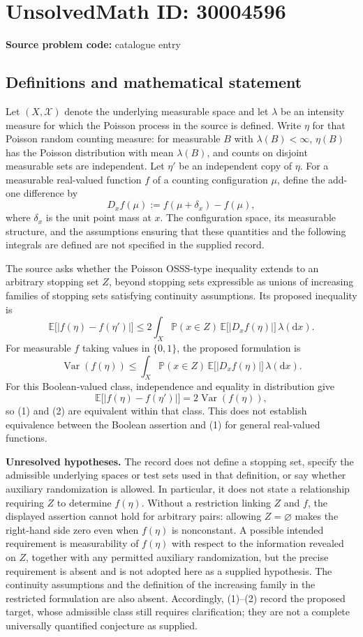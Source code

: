 \documentclass[11pt]{article}
\begin{document}
\section*{UnsolvedMath ID: 30004596}
\textbf{Source problem code:} catalogue entry
\subsection{Definitions and mathematical statement}
Let \((X,\mathcal X)\) denote the underlying measurable space and let \(\lambda\) be an intensity measure for which the Poisson process in the source is defined. Write \(\eta\) for that Poisson random counting measure: for measurable \(B\) with \(\lambda(B)<\infty\), \(\eta(B)\) has the Poisson distribution with mean \(\lambda(B)\), and counts on disjoint measurable sets are independent. Let \(\eta'\) be an independent copy of \(\eta\). For a measurable real-valued function \(f\) of a counting configuration \(\mu\), define the add-one difference by
\[
D_xf(\mu):=f(\mu+\delta_x)-f(\mu),
\]
where \(\delta_x\) is the unit point mass at \(x\). The configuration space, its measurable structure, and the assumptions ensuring that these quantities and the following integrals are defined are not specified in the supplied record.

The source asks whether the Poisson OSSS-type inequality extends to an arbitrary stopping set \(Z\), beyond stopping sets expressible as unions of increasing families of stopping sets satisfying continuity assumptions. Its proposed inequality is
\[
\mathbb E\bigl[|f(\eta)-f(\eta')|\bigr]
\leq
2\int_X \mathbb P(x\in Z)\,
\mathbb E\bigl[|D_xf(\eta)|\bigr]\,\lambda(\mathrm dx).
\tag{1}
\]
For measurable \(f\) taking values in \(\{0,1\}\), the proposed formulation is
\[
\operatorname{Var}(f(\eta))
\leq
\int_X \mathbb P(x\in Z)\,
\mathbb E\bigl[|D_xf(\eta)|\bigr]\,\lambda(\mathrm dx).
\tag{2}
\]
For this Boolean-valued class, independence and equality in distribution give
\[
\mathbb E\bigl[|f(\eta)-f(\eta')|\bigr]
=2\operatorname{Var}(f(\eta)),
\]
so (1) and (2) are equivalent within that class. This does not establish equivalence between the Boolean assertion and (1) for general real-valued functions.

\textbf{Unresolved hypotheses.} The record does not define a stopping set, specify the admissible underlying spaces or test sets used in that definition, or say whether auxiliary randomization is allowed. In particular, it does not state a relationship requiring \(Z\) to determine \(f(\eta)\). Without a restriction linking \(Z\) and \(f\), the displayed assertion cannot hold for arbitrary pairs: allowing \(Z=\varnothing\) makes the right-hand side zero even when \(f(\eta)\) is nonconstant. A possible intended requirement is measurability of \(f(\eta)\) with respect to the information revealed on \(Z\), together with any permitted auxiliary randomization, but the precise requirement is absent and is not adopted here as a supplied hypothesis. The continuity assumptions and the definition of the increasing family in the restricted formulation are also absent. Accordingly, (1)--(2) record the proposed target, whose admissible class still requires clarification; they are not a complete universally quantified conjecture as supplied.
\end{document}
